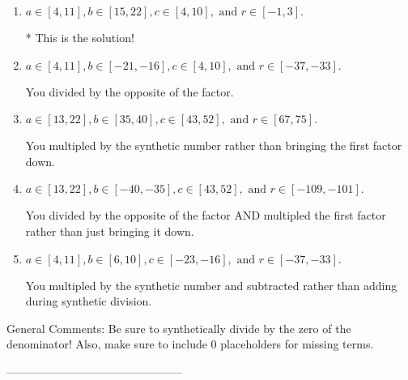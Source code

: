 \documentclass{extbook}[14pt]
\begin{document}
\begin{enumerate}[label=\Alph*.] 
\item $ a \in [4, 11], b \in [15, 22], c \in [4, 10], \text{ and } r \in [-1, 3]. $ 

 * This is the solution! 
\item $ a \in [4, 11], b \in [-21, -16], c \in [4, 10], \text{ and } r \in [-37, -33]. $ 

  You divided by the opposite of the factor. 
\item $ a \in [13, 22], b \in [35, 40], c \in [43, 52], \text{ and } r \in [67, 75]. $ 

  You multipled by the synthetic number rather than bringing the first factor down. 
\item $ a \in [13, 22], b \in [-40, -35], c \in [43, 52], \text{ and } r \in [-109, -101]. $ 

  You divided by the opposite of the factor AND multipled the first factor rather than just bringing it down. 
\item $ a \in [4, 11], b \in [6, 10], c \in [-23, -16], \text{ and } r \in [-37, -33]. $ 

  You multipled by the synthetic number and subtracted rather than adding during synthetic division. 
\end{enumerate} 
 
General Comments: Be sure to synthetically divide by the zero of the denominator! Also, make sure to include 0 placeholders for missing terms.

-----------------------------------------------
\end{document}
